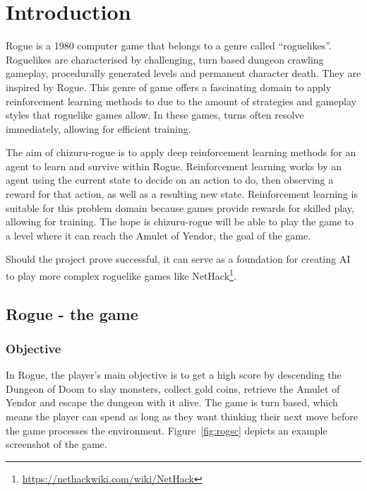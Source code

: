 \documentclass[12pt,a4paper]{article}
\begin{document}
    \newpage

    \tableofcontents
    \listoffigures

    \newpage


    \section{Introduction}\label{sec:introduction}
    Rogue is a 1980 computer game that belongs to a genre called ``roguelikes''.
    Roguelikes are characterised by challenging, turn based dungeon crawling gameplay, procedurally generated levels and permanent character death.
    They are inspired by Rogue.
    This genre of game offers a fascinating domain to apply reinforcement learning methods to due to the amount of strategies and gameplay styles that roguelike games allow.
    In these games, turns often resolve immediately, allowing for efficient training.

    The aim of chizuru-rogue is to apply deep reinforcement learning methods for an agent to learn and survive within Rogue.
    Reinforcement learning works by an agent using the current state to decide on an action to do, then observing a reward for that action, as well as a resulting new state.
    Reinforcement learning is suitable for this problem domain because games provide rewards for skilled play, allowing for training.
    The hope is chizuru-rogue will be able to play the game to a level where it can reach the Amulet of Yendor, the goal of the game.

    Should the project prove successful, it can serve as a foundation for creating AI to play more complex
    roguelike games like NetHack\footnote{\url{https://nethackwiki.com/wiki/NetHack}}.

    \subsection{Rogue - the game}\label{subsec:rogue}
    \subsubsection{Objective}\label{subsubsec:objective}
    In Rogue, the player's main objective is to get a high score by descending the Dungeon of Doom to slay monsters, collect gold coins, retrieve the Amulet of Yendor and escape the dungeon with it alive.
    The game is turn based, which means the player can spend as long as they want thinking their next move before the game processes the environment.
    Figure~\ref{fig:rogsc} depicts an example screenshot of the game.
\end{document}

